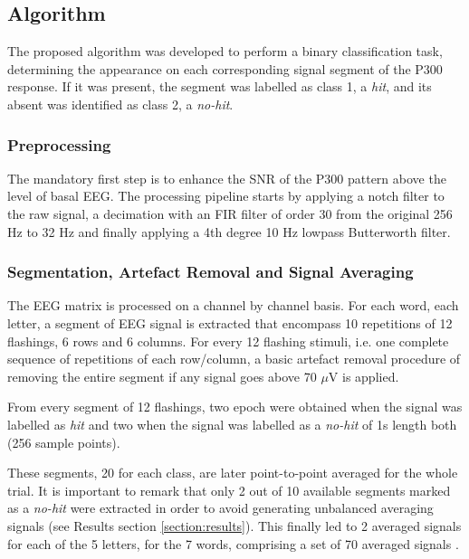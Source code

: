 \documentclass[entropy,article,submit,moreauthors,pdftex,10pt,a4paper]{mdpi}
\begin{document}
\subsection{Algorithm}

The proposed algorithm was developed to perform a binary classification task, determining the appearance on each corresponding signal segment of the P300 response.  If it was present, the segment was labelled as class 1, a \textit{hit}, and its absent was identified as class 2, a \textit{no-hit}.

\subsubsection{Preprocessing}

The mandatory first step is to enhance the SNR of the P300 pattern above the level of basal EEG. The processing pipeline starts by applying a notch filter to the raw signal, a decimation with an FIR filter of order 30 from the original 256 Hz to 32 Hz and finally applying a 4th degree 10 Hz lowpass Butterworth filter.  

\subsubsection{Segmentation, Artefact Removal and Signal Averaging}

The EEG matrix is processed on a channel by channel basis.  For each word, each letter, a segment of EEG signal is extracted that encompass 10 repetitions of 12 flashings, 6 rows and 6 columns.  For every 12 flashing stimuli, i.e. one complete sequence of repetitions of each row/column, a basic artefact removal procedure of removing the entire segment if any signal goes above 70 $\mu$V is applied.

From every segment of 12 flashings, two epoch were obtained when the signal was labelled as \textit{hit} and two when the signal was labelled as a \textit{no-hit} of 1s length both (256 sample points).  

These segments, 20 for each class, are later point-to-point averaged for the whole trial. It is important to remark that only 2 out of 10 available segments marked as a \textit{no-hit} were extracted in order to avoid generating unbalanced averaging signals (see Results section \ref{section:results}). This finally led to 2 averaged signals for each of the 5 letters, for the 7 words, comprising a set of 70 averaged signals \citep{Liang2008}.
\end{document}
